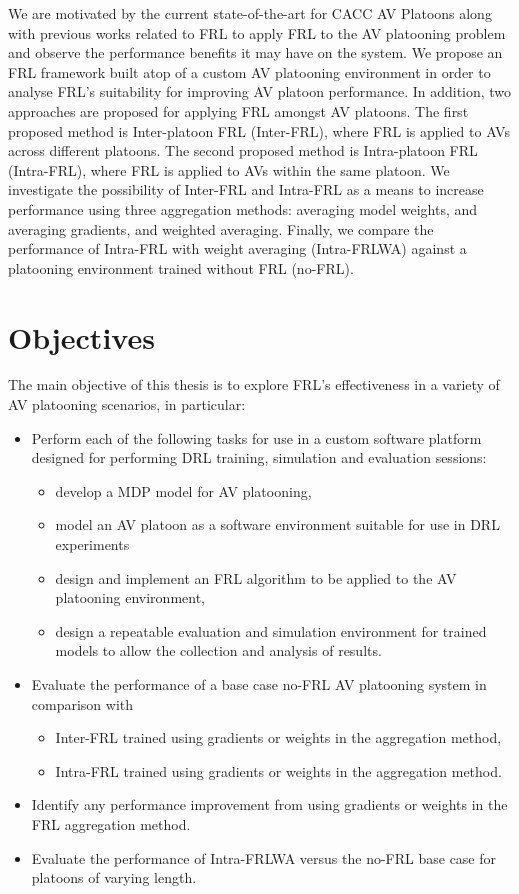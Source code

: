 We are motivated by the current state-of-the-art for CACC AV Platoons along with previous 
works related to FRL to apply FRL to the AV platooning problem and observe the performance 
benefits it may have on the system.  We propose an FRL framework built atop of a custom AV 
platooning environment in order to analyse FRL's suitability for improving AV platoon performance.  
In addition, two approaches are proposed for applying FRL amongst AV platoons. The first proposed 
method is Inter-platoon FRL (Inter-FRL), where FRL is applied to AVs across different platoons.  
The second proposed method is Intra-platoon FRL (Intra-FRL), where FRL is applied to AVs 
within the same platoon.  We investigate the possibility of Inter-FRL and Intra-FRL as a 
means to increase performance using three aggregation methods: averaging model weights, 
and averaging gradients, and weighted averaging.  Finally, we compare the performance 
of Intra-FRL with weight averaging (Intra-FRLWA) against a platooning environment trained 
without FRL (no-FRL).

\section{Objectives}
The main objective of this thesis is to explore FRL's effectiveness in a variety of AV 
platooning scenarios, in particular:

\begin{itemize}
    \item Perform each of the following tasks for use in a custom software platform designed 
    for performing DRL training, simulation and evaluation sessions:
        \begin{itemize}
            \item develop a MDP model for AV platooning, 
            \item model an AV platoon as a software environment suitable for use in DRL 
            experiments
            \item design and implement an FRL algorithm to be applied to the AV platooning 
            environment, 
            \item design a repeatable evaluation and simulation environment for trained 
            models to allow the collection and analysis of results.
        \end{itemize}
    \item Evaluate the performance of a base case no-FRL AV platooning system in 
    comparison with
        \begin{itemize}
            \item Inter-FRL trained using gradients or weights in the aggregation method,
            \item Intra-FRL trained using gradients or weights in the aggregation method.
        \end{itemize}
    \item Identify any performance improvement from using gradients or weights in the 
    FRL aggregation method.
    \item Evaluate the performance of Intra-FRLWA versus the no-FRL base case for 
    platoons of varying length.
\end{itemize}

